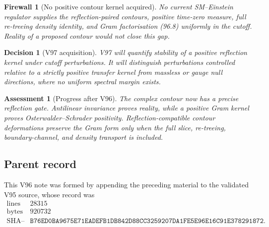 \documentclass[11pt]{article}
\newtheorem{assessment}[theorem]{Assessment}
\newtheorem{firewall}[theorem]{Firewall}
\newtheorem{decision}[theorem]{Decision}
\begin{document}
\begin{firewall}[No positive contour kernel acquired]
\label{fire:v11v96-boundary}
No current SM--Einstein regulator supplies the reflection-paired
contours, positive time-zero measure, full re-treeing density
identity, and Gram factorisation (96.8) uniformly in the cutoff.
Reality of a proposed contour would not close this gap.
\end{firewall}

\begin{decision}[V97 acquisition]
\label{dec:v11v96-next}
V97 will quantify stability of a positive reflection kernel under
cutoff perturbations.  It will distinguish perturbations controlled
relative to a strictly positive transfer kernel from massless or
gauge null directions, where no uniform spectral margin exists.
\end{decision}

\begin{assessment}[Progress after V96]
\label{ass:v11v96-status}
The complex contour now has a precise reflection gate.  Antilinear
invariance proves reality, while a positive Gram kernel proves
Osterwalder--Schrader positivity.  Reflection-compatible contour
deformations preserve the Gram form only when the full slice,
re-treeing, boundary-channel, and density transport is included.
\end{assessment}

\subsection{Parent record}

This V96 note was formed by appending the preceding material to the
validated V95 source, whose record was
\[
\begin{array}{c|c}
\text{lines}&28315\\
\text{bytes}&920732\\
\text{SHA--256}&
\texttt{B76ED0BA9675E71EADEFB1DB842D88CC3259207DA1FE5E96E16C91E378291872}.
\end{array}                                                     \tag{96.20}
\]

\end{document}
